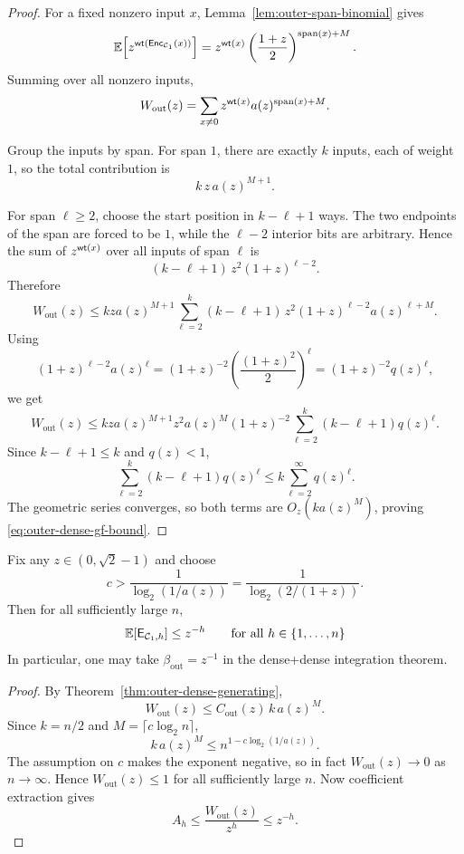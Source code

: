 \begin{proof}
For a fixed nonzero input \(x\), Lemma~\ref{lem:outer-span-binomial} gives
\[
\mathbb{E}\!\left[z^{\mathsf{wt}(\mathsf{Enc}_{{\mathcal{C}_1}}(x))}\right]
=
z^{\mathsf{wt}(x)}\left(\frac{1+z}{2}\right)^{\operatorname{span}(x)+M}.
\]
Summing over all nonzero inputs,
\[
W_{\mathrm{out}}(z)
=
\sum_{x\neq 0}
z^{\mathsf{wt}(x)}a(z)^{\operatorname{span}(x)+M}.
\]

Group the inputs by span.
For span \(1\), there are exactly \(k\) inputs, each of weight \(1\), so the total contribution is
\[
k\,z\,a(z)^{M+1}.
\]

For span \(\ell\ge 2\), choose the start position in \(k-\ell+1\) ways.
The two endpoints of the span are forced to be \(1\), while the \(\ell-2\) interior bits are arbitrary.
Hence the sum of \(z^{\mathsf{wt}(x)}\) over all inputs of span \(\ell\) is
\[
(k-\ell+1)\,z^2(1+z)^{\ell-2}.
\]
Therefore
\[
W_{\mathrm{out}}(z)
\le
kza(z)^{M+1}
\sum_{\ell=2}^{k}
(k-\ell+1)\,z^2(1+z)^{\ell-2}a(z)^{\ell+M}.
\]
Using
\[
(1+z)^{\ell-2}a(z)^\ell
=(1+z)^{-2}\left(\frac{(1+z)^2}{2}\right)^\ell
=(1+z)^{-2}q(z)^\ell,
\]
we get
\[
W_{\mathrm{out}}(z)
\le
kza(z)^{M+1}
z^2a(z)^M(1+z)^{-2}
\sum_{\ell=2}^{k}(k-\ell+1)q(z)^\ell.
\]
Since \(k-\ell+1\le k\) and \(q(z)<1\),
\[
\sum_{\ell=2}^{k}(k-\ell+1)q(z)^\ell
\le
k\sum_{\ell=2}^{\infty}q(z)^\ell.
\]
The geometric series converges, so both terms are \(O_z(k a(z)^M)\), proving \eqref{eq:outer-dense-gf-bound}.
\end{proof}

\begin{corollary}
\label{lem:outer-dense-spectrum}
Fix any \(z\in(0,\sqrt2-1)\) and choose
\[
c>\frac{1}{\log_2(1/a(z))}
=
\frac{1}{\log_2(2/(1+z))}.
\]
Then for all sufficiently large \(n\),
\[
\mathbb{E}[\mathsf{E}_{{\mathcal{C}_1},h}] \le z^{-h}
\qquad\text{for all }h\in\{1,\dots,n\}
\]
In particular, one may take \(\beta_{\mathrm{out}}=z^{-1}\) in the dense+dense integration theorem.
\end{corollary}

\begin{proof}
By Theorem~\ref{thm:outer-dense-generating},
\[
W_{\mathrm{out}}(z)\le C_{\mathrm{out}}(z)\,k\,a(z)^M.
\]
Since \(k=n/2\) and \(M=\lceil c\log_2 n\rceil\),
\[
k\,a(z)^M
\le
n^{1-c\log_2(1/a(z))}.
\]
The assumption on \(c\) makes the exponent negative, so in fact \(W_{\mathrm{out}}(z)\to 0\) as \(n\to\infty\).
Hence \(W_{\mathrm{out}}(z)\le 1\) for all sufficiently large \(n\).
Now coefficient extraction gives
\[
A_h \le \frac{W_{\mathrm{out}}(z)}{z^h}\le z^{-h}.
\]
\end{proof}

